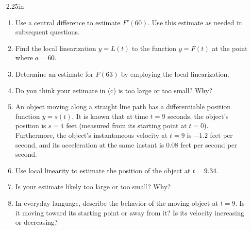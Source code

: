 \begin{adjustwidth*}{}{-2.25in}
\begin{multicols*}{2}
\begin{enumerate}[1),resume]


\ba
	\item Use a central difference to estimate $F'(60)$.  Use this estimate as needed in subsequent questions.
	\item Find the local linearization $y = L(t)$ to the function $y = F(t)$ at the point where $a = 60$.
	\item Determine an estimate for $F(63)$ by employing the local linearization.  
	\item Do you think your estimate in (c) is too large or too small?  Why?
\ea

\item An object moving along a straight line path has a differentiable position function $y = s(t)$.  It is known that at time $t = 9$ seconds, the object's position is $s = 4$ feet (measured from its starting point at $t = 0$).  Furthermore, the object's instantaneous velocity at $t = 9$ is $-1.2$ feet per second, and its acceleration at the same instant is $0.08$ feet per second per second.

\ba
	\item Use local linearity to estimate the position of the object at $t = 9.34$.
	\item Is your estimate likely too large or too small?  Why?
	\item In everyday language, describe the behavior of the moving object at $t = 9$.  Is it moving toward its starting point or away from it? Is its velocity increasing or decreasing?
\ea


\end{enumerate}
\end{multicols*}
\end{adjustwidth*}
